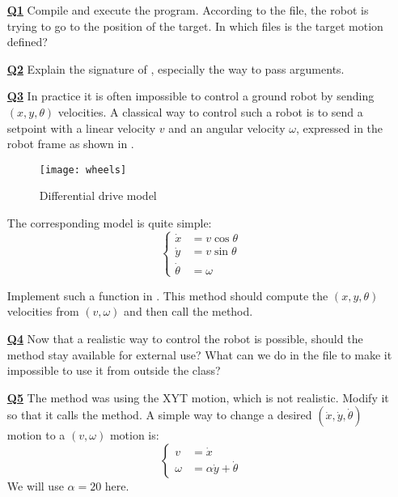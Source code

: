 \documentclass{ecnreport}
\begin{document}
\begin{itemize}
\medskip\item[\textbf{\underline{Q1}}]  Compile and execute the program. According to the  file, the robot is trying to go to the position of the target. In which files is the target motion defined?

\medskip\item[\textbf{\underline{Q2}}] Explain the signature of   , especially the way to pass arguments.

\medskip\item[\textbf{\underline{Q3}}] In practice it is often impossible to control a ground robot by sending $(x,y,\theta)$ velocities. A classical way to control such a robot is to send a setpoint with a linear velocity $v$ and an angular velocity $\omega$, expressed in the robot frame as shown in .

\begin{figure}[h!]\centering
\texttt{[image: wheels]}
\caption{\label{fig:dd} Differential drive model}
\end{figure}

The corresponding model is quite simple:
\begin{equation*}
\left\{\begin{array}{ll}
\dot x &= v\cos \theta \\
\dot y &= v\sin \theta \\
\dot \theta &= \omega
\end{array}\right.
\end{equation*}

Implement such a function in . This method should compute the $(x,y,\theta)$ velocities from $(v,\omega)$ and then call the  method.

\medskip\item[\textbf{\underline{Q4}}] Now that a realistic way to control the robot is possible, should the  method stay available for external use? What can we do in the  file to make it impossible to use it from outside the  class?

\medskip\item[\textbf{\underline{Q5}}] The  method was using the XYT motion, which is not realistic.
Modify it so that it calls the  method. A simple way to change a desired $(\dot x, \dot y, \dot \theta)$ motion
to a $(v, \omega)$ motion is:
\begin{equation*}\left\{\begin{array}{ll}
 v& = \dot x\\
 \omega &= \alpha\dot y + \dot \theta\end{array}\right.
\end{equation*}We will use $\alpha = 20$ here.


\end{itemize}
\end{document}

